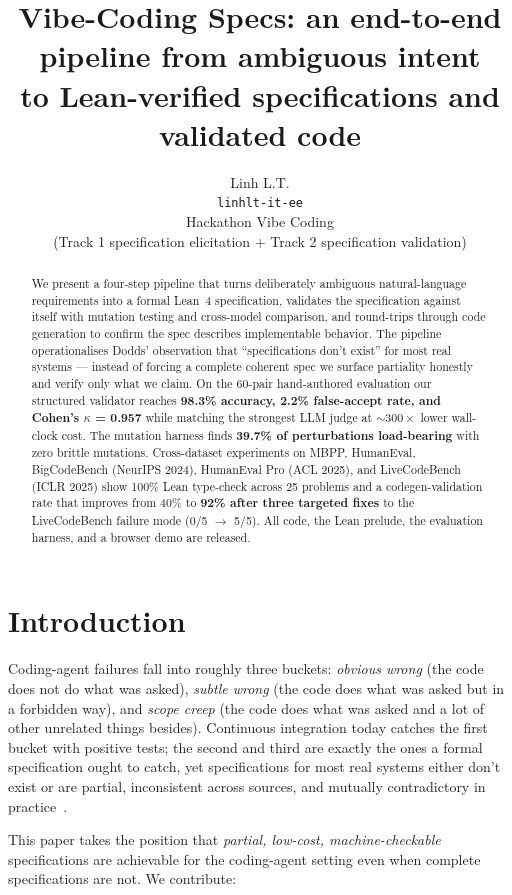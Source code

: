 \documentclass{article}
\title{Vibe-Coding Specs: an end-to-end pipeline from ambiguous intent\\to Lean-verified specifications and validated code}
\author{%
  Linh L.T.\\
  \texttt{linhlt-it-ee}\\
  Hackathon Vibe Coding\\
  (Track 1 specification elicitation + Track 2 specification validation)
}
\begin{document}
\maketitle

\begin{abstract}
We present a four-step pipeline that turns deliberately ambiguous natural-language requirements into a formal Lean~4 specification, validates the specification against itself with mutation testing and cross-model comparison, and round-trips through code generation to confirm the spec describes implementable behavior. The pipeline operationalises Dodds' observation that ``specifications don't exist'' for most real systems --- instead of forcing a complete coherent spec we surface partiality honestly and verify only what we claim. On the 60-pair hand-authored evaluation our structured validator reaches \textbf{98.3\% accuracy, 2.2\% false-accept rate, and Cohen's $\kappa$ = 0.957} while matching the strongest LLM judge at ${\sim}300\times$ lower wall-clock cost. The mutation harness finds \textbf{39.7\% of perturbations load-bearing} with zero brittle mutations. Cross-dataset experiments on MBPP, HumanEval, BigCodeBench (NeurIPS 2024), HumanEval Pro (ACL 2025), and LiveCodeBench (ICLR 2025) show 100\% Lean type-check across 25 problems and a codegen-validation rate that improves from 40\% to \textbf{92\% after three targeted fixes} to the LiveCodeBench failure mode (0/5 $\to$ 5/5). All code, the Lean prelude, the evaluation harness, and a browser demo are released.
\end{abstract}

\section{Introduction}

Coding-agent failures fall into roughly three buckets: \emph{obvious wrong} (the code does not do what was asked), \emph{subtle wrong} (the code does what was asked but in a forbidden way), and \emph{scope creep} (the code does what was asked and a lot of other unrelated things besides). Continuous integration today catches the first bucket with positive tests; the second and third are exactly the ones a formal specification ought to catch, yet specifications for most real systems either don't exist or are partial, inconsistent across sources, and mutually contradictory in practice~\cite{dodds2025}.

This paper takes the position that \emph{partial, low-cost, machine-checkable} specifications are achievable for the coding-agent setting even when complete specifications are not. We contribute:
\end{document}
